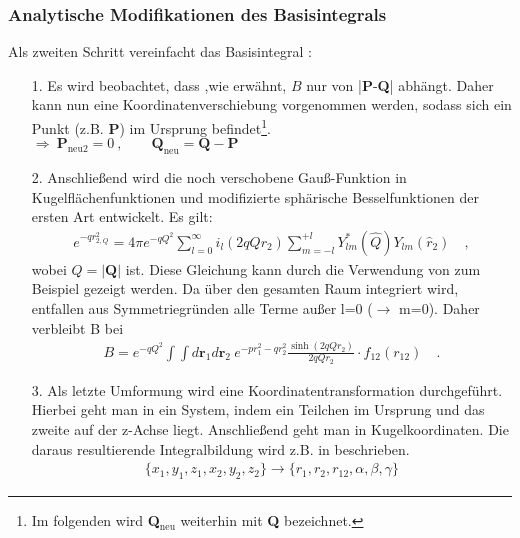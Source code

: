 \subsubsection{Analytische Modifikationen des Basisintegrals}\label{sec:modifik}
%
Als zweiten Schritt vereinfacht \cite{av:1a} das Basisintegral :
\begin{enumerate}
	\item[1.]  Es wird beobachtet, dass ,wie erwähnt, $B$ nur 
	von 
	|\textbf{P}-\textbf{Q}| abhängt. Daher kann nun eine 
	Koordinatenverschiebung 
	vorgenommen werden, sodass sich ein Punkt (z.B. \textbf{P}) im Ursprung 
	befindet\footnote{Im folgenden wird \textbf{Q}$_\text{neu}$ weiterhin mit 
	\textbf{Q} bezeichnet.}.\\
	$\Rightarrow \ \textbf{P}_\text{neu2}=0\ , \qquad 
	\textbf{Q}_{\text{neu}}=\textbf{Q}-\textbf{P}$
	\item[2.] Anschließend wird die noch verschobene Gauß-Funktion in 
	Kugelflächenfunktionen und modifizierte sphärische Besselfunktionen der 
	ersten Art entwickelt. Es gilt:
	\begin{align}
	e^{-qr_{2,Q}^2}=4\pi 
	e^{-qQ^2}\sum_{l=0}^{\infty}i_l(2qQr_2)\sum_{m=-l}^{+l} 
	Y_{lm}^*(\hat{Q})Y_{lm}(\hat{r}_2) \quad,
	\end{align}
	wobei $Q=|\textbf{Q}|$ ist. Diese Gleichung kann durch 
	die Verwendung von zum Beispiel \cite{b:5a} gezeigt 
	werden.
	Da über den gesamten Raum integriert wird, entfallen aus  
	Symmetriegründen 
	alle Terme außer l=0 ($\rightarrow$ m=0). Daher verbleibt B bei
	\begin{align}\label{eq:Basisintegral:zwerg}
	B=e^{-qQ^2} \int \int d\textbf{r}_1 d\textbf{r}_2\ e^{-pr_1^2-qr_2^2} 
	\frac{\sinh(2qQr_2)}{2qQr_2}\cdot f_{12}(r_{12}) \quad .
	\end{align}
	\item[3.] Als letzte Umformung wird eine Koordinatentransformation 
	durchgeführt. Hierbei geht man in ein System, indem ein Teilchen  im 
	Ursprung und das zweite auf der z-Achse liegt. Anschließend geht man in 
	Kugelkoordinaten. Die daraus resultierende Integralbildung wird z.B. in 
	\cite{av:6a} beschrieben. 
	\begin{align*}
	\{x_1,y_1,z_1,x_2,y_2,z_2\}\rightarrow\{r_1,r_2,r_{12},\alpha,\beta,\gamma\}
	\end{align*}
	

\end{enumerate}
